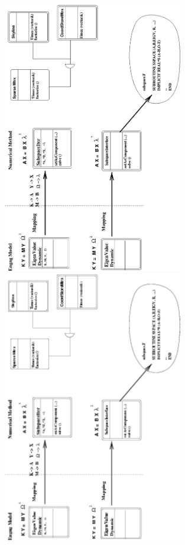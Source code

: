 \documentclass[a4paper]{article}
\begin{document}
\begin{figure}[tb]
\begin{htmlonly}
  \centerline{\includegraphics[width=0.7\textwidth]{engng.eps}}
\end{htmlonly}
\ifpdf
\centerline{\includegraphics[width=0.7\textwidth]{engng.pdf}}

\end{figure}
\end{document}
